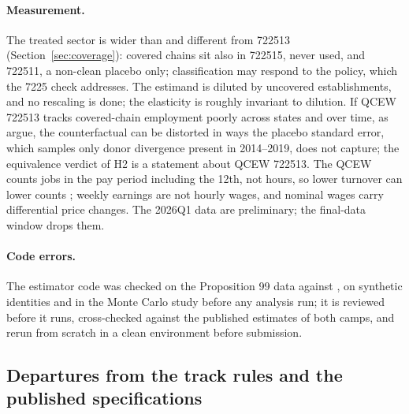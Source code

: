 \paragraph{Measurement.} The treated sector is wider than and different from 722513
(Section~\ref{sec:coverage}): covered chains sit also in 722515, never used, and 722511, a non-clean
placebo only; classification may respond to the policy, which the 7225 check addresses. The estimand
is diluted by uncovered establishments, and no rescaling is done; the elasticity is roughly invariant
to dilution. If QCEW 722513 tracks covered-chain employment poorly across states and over time, as
\citet{melo2026covered} argue, the counterfactual can be distorted in ways the placebo standard error,
which samples only donor divergence present in 2014--2019, does not capture; the equivalence verdict
of H2 is a statement about QCEW 722513. The QCEW counts jobs in the pay period including the 12th,
not hours, so lower turnover can lower counts \citep{dube2026labor}; weekly earnings are not hourly
wages, and nominal wages carry differential price changes. The 2026Q1 data are preliminary; the
final-data window drops them.

\paragraph{Code errors.} The estimator code was checked on the Proposition 99 data against
\citet[Table~1]{arkhangelsky2021synthetic}, on synthetic identities and in the Monte Carlo study
before any analysis run; it is reviewed before it runs, cross-checked against the published
estimates of both camps, and rerun from scratch in a clean environment before submission.

\subsection{Departures from the track rules and the published specifications}
\label{sec:departures}

